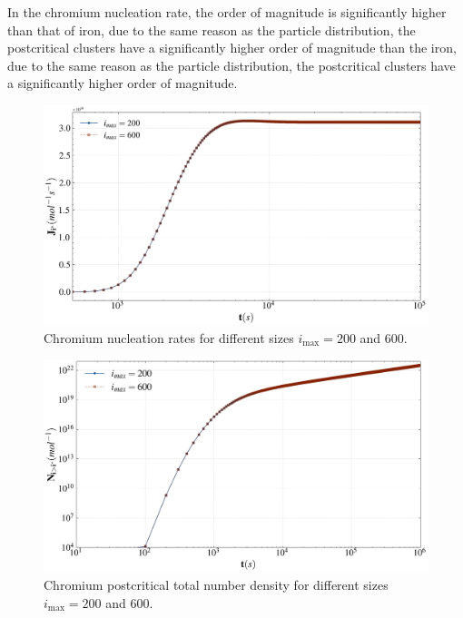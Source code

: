 In the chromium nucleation rate, the order of magnitude is significantly higher than that of iron, due to the same reason as the particle distribution, 
the postcritical clusters have a significantly higher order of magnitude than the iron, due to the same reason as the particle distribution, the postcritical 
clusters have a significantly higher order of magnitude.
\begin{figure}[H]
    \centering
    \includegraphics[width=1.1\linewidth]{postcritical_nucleation_rate_cr.png}
    \caption{Chromium nucleation rates for different sizes $i_{\text{max}} = 200$ and $600$.}
    \label{fig:postcritical_nucleation_rate_cr}
\end{figure}

\begin{figure}[H]
    \centering
    \includegraphics[width=1.1\linewidth]{postcritical_number_cr.png}
    \caption{Chromium postcritical total number density for different sizes $i_{\text{max}} = 200$ and $600$.}
    \label{fig:postcritical_number_cr}
\end{figure}

